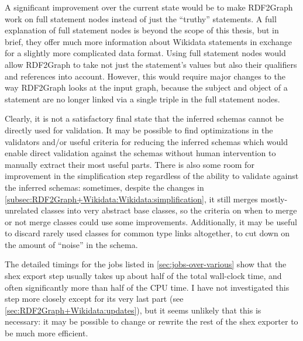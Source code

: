 A significant improvement over the current state
would be to make RDF2Graph work on full statement nodes instead of just the “truthy” statements.
A full explanation of full statement nodes is beyond the scope of this thesis,
but in brief, they offer much more information about Wikidata statements
in exchange for a slightly more complicated data format.
Using full statement nodes would allow RDF2Graph to take not just the statement’s values
but also their qualifiers and references into account.
However, this would require major changes to the way RDF2Graph looks at the input graph,
because the subject and object of a statement are no longer linked via a single triple
in the full statement nodes.

Clearly, it is not a satisfactory final state
that the inferred schemas cannot be directly used for validation.
It may be possible to find optimizations in the validators
and/or useful criteria for reducing the inferred schemas
which would enable direct validation against the schemas
without human intervention to manually extract their most useful parts.
There is also some room for improvement in the simplification step
regardless of the ability to validate against the inferred schemas:
sometimes, despite the changes in \cref{subsec:RDF2Graph+Wikidata:Wikidata:simplification},
it still merges mostly-unrelated classes into very abstract base classes,
so the criteria on when to merge or not merge classes could use some improvements.
Additionally, it may be useful to discard rarely used classes for common type links altogether,
to cut down on the amount of “noise” in the schema.

The detailed timings for the jobs listed in \cref{sec:jobs-over-various}
show that the \gls{shex} export step usually takes up about half of the total wall-clock time,
and often significantly more than half of the CPU time.
I have not investigated this step more closely except for its very last part
(see \cref{sec:RDF2Graph+Wikidata:updates}),
but it seems unlikely that this is necessary:
it may be possible to change or rewrite the rest of the \gls{shex} exporter to be much more efficient.


